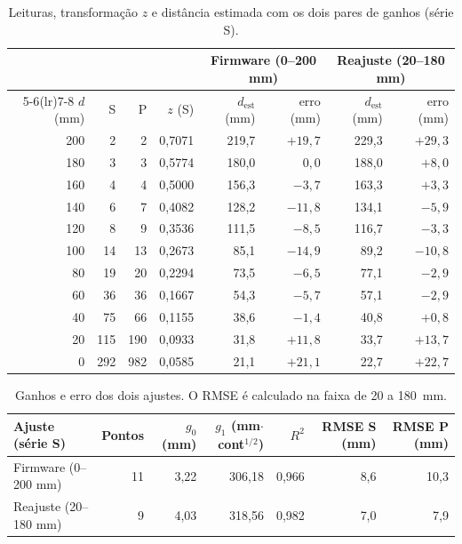 \documentclass[11pt,a4paper]{article}
\begin{document}
\begin{table}[!htb]
\centering
\small
\caption{Leituras, transformação $z$ e distância estimada com os dois pares de ganhos (série S).}
\label{tab:dados}
\begin{tabular}{rrrrrrrr}
\toprule
 & & & & \multicolumn{2}{c}{Firmware (0--200 mm)} & \multicolumn{2}{c}{Reajuste (20--180 mm)} \\
\cmidrule(lr){5-6}\cmidrule(lr){7-8}
$d$ (mm) & S & P & $z$ (S) & $d_{\mathrm{est}}$ (mm) & erro (mm) & $d_{\mathrm{est}}$ (mm) & erro (mm) \\
\midrule
200 & 2   & 2   & 0,7071 & 219,7 & $+19{,}7$ & 229,3 & $+29{,}3$ \\
180 & 3   & 3   & 0,5774 & 180,0 & $0{,}0$   & 188,0 & $+8{,}0$ \\
160 & 4   & 4   & 0,5000 & 156,3 & $-3{,}7$  & 163,3 & $+3{,}3$ \\
140 & 6   & 7   & 0,4082 & 128,2 & $-11{,}8$ & 134,1 & $-5{,}9$ \\
120 & 8   & 9   & 0,3536 & 111,5 & $-8{,}5$  & 116,7 & $-3{,}3$ \\
100 & 14  & 13  & 0,2673 & 85,1  & $-14{,}9$ & 89,2  & $-10{,}8$ \\
80  & 19  & 20  & 0,2294 & 73,5  & $-6{,}5$  & 77,1  & $-2{,}9$ \\
60  & 36  & 36  & 0,1667 & 54,3  & $-5{,}7$  & 57,1  & $-2{,}9$ \\
40  & 75  & 66  & 0,1155 & 38,6  & $-1{,}4$  & 40,8  & $+0{,}8$ \\
20  & 115 & 190 & 0,0933 & 31,8  & $+11{,}8$ & 33,7  & $+13{,}7$ \\
0   & 292 & 982 & 0,0585 & 21,1  & $+21{,}1$ & 22,7  & $+22{,}7$ \\
\bottomrule
\end{tabular}
\end{table}

\begin{table}[!htb]
\centering
\small
\caption{Ganhos e erro dos dois ajustes. O RMSE é calculado na faixa de 20 a 180~mm.}
\label{tab:ganhos}
\setlength{\tabcolsep}{4pt}
\begin{tabular}{lrrrrrr}
\toprule
Ajuste (série S) & Pontos & $g_0$ (mm) & $g_1$ (mm$\cdot$cont$^{1/2}$) & $R^2$ & RMSE S (mm) & RMSE P (mm) \\
\midrule
Firmware (0--200 mm)  & 11 & 3,22 & 306,18 & 0,966 & 8,6 & 10,3 \\
Reajuste (20--180 mm) & 9  & 4,03 & 318,56 & 0,982 & 7,0 & 7,9 \\
\bottomrule
\end{tabular}
\end{table}
\end{document}
